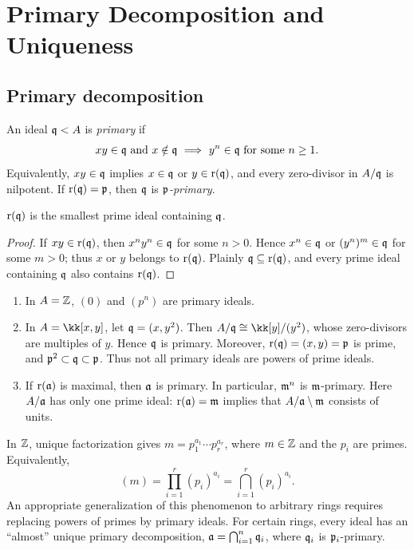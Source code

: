 \documentclass[11pt,a4paper]{article}
\begin{document}
\section*{Primary Decomposition and Uniqueness}
\subsection{Primary decomposition}
\setcounter{definition}{8}\begin{definition}
An ideal $\qq<A$ is \emph{primary} if
\[
xy\in\qq\text{ and }x\notin\qq\ \Longrightarrow\ y^n\in\qq\text{ for some }n\geq1.
\]
Equivalently, $xy\in\qq$ implies $x\in\qq$ or $y\in\rad(\qq)$, and every zero-divisor in $A/\qq$ is nilpotent. If $\rad(\qq)=\pp$, then $\qq$ is \emph{$\pp$-primary}.
\end{definition}
\begin{claim}
$\rad(\qq)$ is the smallest prime ideal containing $\qq$.
\end{claim}
\begin{proof}
If $xy\in\rad(\qq)$, then $x^ny^n\in\qq$ for some $n>0$. Hence $x^n\in\qq$ or $(y^n)^m\in\qq$ for some $m>0$; thus $x$ or $y$ belongs to $\rad(\qq)$. Plainly $\qq\subseteq\rad(\qq)$, and every prime ideal containing $\qq$ also contains $\rad(\qq)$.
\end{proof}
\setcounter{example}{6}\begin{example}
\begin{enumerate}[label=(\roman*)]
\setcounter{enumi}{0}\item In $A=\Z$, $(0)$ and $(p^n)$ are primary ideals.
\setcounter{enumi}{1}\item In $A=\kk[x,y]$, let $\qq=(x,y^2)$. Then $A/\qq\cong\kk[y]/(y^2)$, whose zero-divisors are multiples of $y$. Hence $\qq$ is primary. Moreover, $\rad(\qq)=(x,y)=\pp$ is prime, and $\pp^2\subset\qq\subset\pp$. Thus not all primary ideals are powers of prime ideals.
\setcounter{enumi}{2}\item If $\rad(\aa)$ is maximal, then $\aa$ is primary. In particular, $\mm^n$ is $\mm$-primary. Here $A/\aa$ has only one prime ideal: $\rad(\aa)=\mm$ implies that $A/\aa\setminus\mm$ consists of units.
\end{enumerate}
\end{example}
\begin{remark}
In $\Z$, unique factorization gives $m=p_1^{a_1}\cdots p_r^{a_r}$, where $m\in\Z$ and the $p_i$ are primes. Equivalently,
\[(m)=\prod_{i=1}^r(p_i)^{a_i}=\bigcap_{i=1}^r(p_i)^{a_i}.\]
An appropriate generalization of this phenomenon to arbitrary rings requires replacing powers of primes by primary ideals. For certain rings, every ideal has an ``almost'' unique primary decomposition, $\aa=\bigcap_{i=1}^n\qq_i$, where $\qq_i$ is $\pp_i$-primary.
\end{remark}
\end{document}

